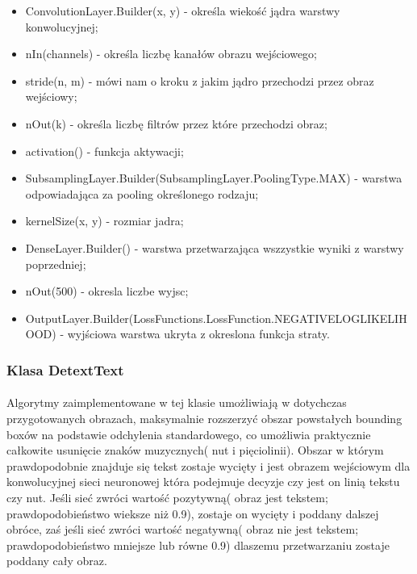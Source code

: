 \documentclass[a4paper,12pt]{article}
\begin{document}
            \begin{spacing}{1}
            \begin{itemize}
                \item ConvolutionLayer.Builder(x, y) - określa wiekość jądra warstwy konwolucyjnej;
                \item nIn(channels) - określa liczbę kanałów obrazu wejściowego;
                \item stride(n, m) - mówi nam o kroku z jakim jądro przechodzi przez obraz wejściowy;
                \item nOut(k) - określa liczbę filtrów przez które przechodzi obraz; 
                \item activation() - funkcja aktywacji;
                \item SubsamplingLayer.Builder(SubsamplingLayer.PoolingType.MAX) - warstwa odpowiadająca za pooling określonego rodzaju; 
                \item kernelSize(x, y) - rozmiar jadra;
                \item DenseLayer.Builder() - warstwa przetwarzająca wszzystkie wyniki z warstwy poprzedniej; 
                \item nOut(500) - okresla liczbe wyjsc;
                \item OutputLayer.Builder(LossFunctions.LossFunction.NEGATIVELOGLIKELIHOOD) - wyjściowa warstwa ukryta z okreslona funkcja straty.
            \end{itemize}
		\end{spacing}
		
		\subsubsection{Klasa DetextText} 		
			\paragraph{} Algorytmy zaimplementowane w tej klasie umożliwiają w              dotychczas przygotowanych obrazach, maksymalnie rozszerzyć obszar           powsta\l ych bounding boxów na podstawie odchylenia standardowego, co       umożliwia praktycznie ca\l kowite usunięcie znaków muzycznych( nut i        pięciolinii). Obszar w którym prawdopodobnie znajduje się tekst zostaje     wycięty i jest obrazem wejściowym dla konwolucyjnej sieci neuronowej        która podejmuje decyzje czy jest on linią tekstu czy nut. Jeśli sieć        zwróci wartość pozytywną( obraz jest tekstem; prawdopodobieństwo wieksze     niż 0.9), zostaje on wycięty i poddany dalszej obróce, zaś jeśli sieć       zwróci wartość negatywną( obraz nie jest tekstem; prawdopodobieństwo        mniejsze lub równe 0.9) dlaszemu przetwarzaniu zostaje poddany cały         obraz.  
\end{document}
